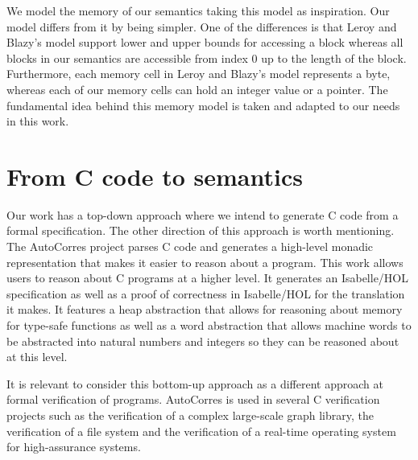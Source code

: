 We model the memory of our semantics taking this model as inspiration.
Our model differs from it by being simpler.
One of the differences is that Leroy and Blazy's model support lower and upper bounds for accessing a block whereas all blocks in our semantics are accessible from index $0$ up to the length of the block.
Furthermore, each memory cell in Leroy and Blazy's model represents a byte, whereas each of our memory cells can hold an integer value or a pointer.
The fundamental idea behind this memory model is taken and adapted to our needs in this work.


\section{From C code to semantics}

Our work has a top-down approach where we intend to generate C code from a formal specification.
The other direction of this approach is worth mentioning.
The AutoCorres project\cite{autocorres} parses C code and generates a high-level monadic representation that makes it easier to reason about a program.
This work allows users to reason about C programs at a higher level.
It generates an Isabelle/HOL specification as well as a proof of correctness in Isabelle/HOL for the translation it makes.
It features a heap abstraction that allows for reasoning about memory for type-safe functions as well as a word abstraction that allows machine words to be abstracted into natural numbers and integers so they can be reasoned about at this level.

It is relevant to consider this bottom-up approach as a different approach at formal verification of programs.
AutoCorres is used in several C verification projects such as the verification of a complex large-scale graph library, the verification of a file system and the verification of a real-time operating system for high-assurance systems.
